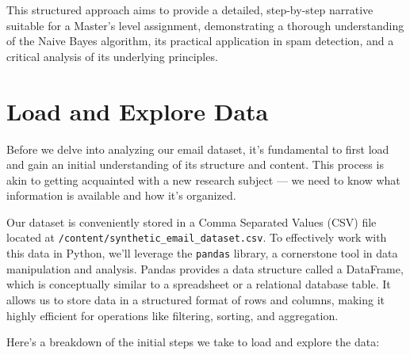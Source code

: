 \documentclass[12pt,letterpaper]{article}
\begin{document}
This structured approach aims to provide a detailed, step-by-step narrative suitable for a Master's level assignment, demonstrating a thorough understanding of the Naive Bayes algorithm, its practical application in spam detection, and a critical analysis of its underlying principles.

\section{Load and Explore Data}

Before we delve into analyzing our email dataset, it's fundamental to first load and gain an initial understanding of its structure and content. This process is akin to getting acquainted with a new research subject --- we need to know what information is available and how it's organized.

Our dataset is conveniently stored in a Comma Separated Values (CSV) file located at \texttt{/content/synthetic\_email\_dataset.csv}. To effectively work with this data in Python, we'll leverage the \texttt{pandas} library, a cornerstone tool in data manipulation and analysis. Pandas provides a data structure called a DataFrame, which is conceptually similar to a spreadsheet or a relational database table. It allows us to store data in a structured format of rows and columns, making it highly efficient for operations like filtering, sorting, and aggregation.

Here's a breakdown of the initial steps we take to load and explore the data:
\end{document}
